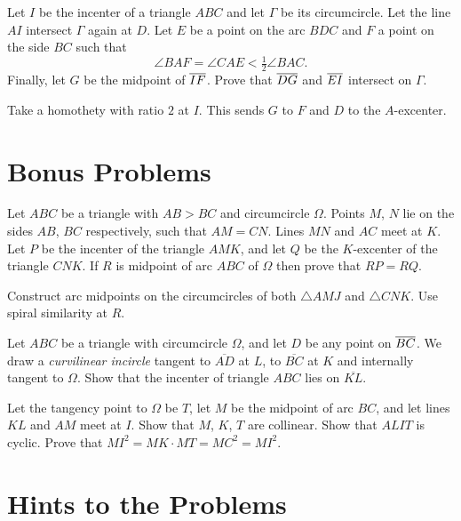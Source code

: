 \documentclass[11pt]{scrartcl}
\begin{document}
\begin{problem}
	[IMO 2010]
	Let $I$ be the incenter of a triangle $ABC$ and let $\Gamma$ be its circumcircle.
	Let the line $AI$ intersect $\Gamma$ again at $D$.
	Let $E$ be a point on the arc $BDC$ and $F$ a point on the side $BC$ such that
	\[ \angle BAF = \angle CAE < \tfrac12 \angle BAC . \]
	Finally, let $G$ be the midpoint of $\overline{IF}$. Prove that $\overline{DG}$ and $\overline{EI}$ intersect on $\Gamma$.
	\begin{hint}
		Take a homothety with ratio $2$ at $I$.
		This sends $G$ to $F$ and $D$ to the $A$-excenter.
	\end{hint}
\end{problem}

\section{Bonus Problems}
\begin{problem}
	[Russia 2014] Let $ABC$ be a triangle with $AB>BC$ and circumcircle $\Omega$.
	Points $M$, $N$ lie on the sides $AB$, $BC$ respectively, such that $AM=CN$.
	Lines $MN$ and $AC$ meet at $K$.
	Let $P$ be the incenter of the triangle $AMK$, and let $Q$ be the $K$-excenter of the triangle $CNK$.
	If $R$ is midpoint of arc $ABC$ of $\Omega$ then prove that $RP=RQ$.
	\begin{hint}
		Construct arc midpoints on the circumcircles of both $\triangle AMJ$ and $\triangle CNK$.
		Use spiral similarity at $R$.
	\end{hint}
\end{problem}
\begin{problem}
	Let $ABC$ be a triangle with circumcircle $\Omega$, and let $D$ be any point on $\overline{BC}$.
	We draw a \emph{curvilinear incircle} tangent to $\overline{AD}$ at $L$, to $\overline{BC}$ at $K$
	and internally tangent to $\Omega$.
	Show that the incenter of triangle $ABC$ lies on $\overline{KL}$.
	\begin{hint}
		Let the tangency point to $\Omega$ be $T$, let $M$ be the midpoint of arc $BC$,
		and let lines $KL$ and $AM$ meet at $I$.
		Show that $M$, $K$, $T$ are collinear.
		Show that $ALIT$ is cyclic.
		Prove that $MI^2 = MK \cdot MT = MC^2 = MI^2$.
	\end{hint}
\end{problem}


\eject

\section{Hints to the Problems}
\begin{enumerate}

\end{enumerate}
\end{document}
